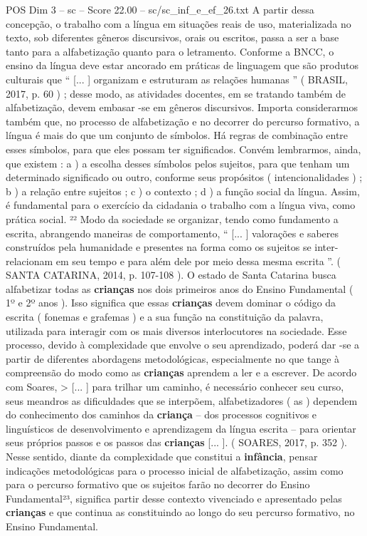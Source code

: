 \begin{textsample}{POS Dim 3 – sc – Score 22.00 – sc/sc\_inf\_e\_ef\_26.txt}
A partir dessa concepção, o trabalho com a língua em situações reais de uso, materializada no texto, sob diferentes gêneros discursivos, orais ou escritos, passa a ser a base tanto para a alfabetização quanto para o letramento.
Conforme a BNCC, o ensino da língua deve estar ancorado em práticas de linguagem que são produtos culturais que “ [... ] organizam e estruturam as relações humanas ” ( BRASIL, 2017, p. 60 ) ; desse modo, as atividades docentes, em se tratando também de alfabetização, devem embasar -se em gêneros discursivos.
Importa considerarmos também que, no processo de alfabetização e no decorrer do percurso formativo, a língua é mais do que um conjunto de símbolos.
Há regras de combinação entre esses símbolos, para que eles possam ter significados.
Convém lembrarmos, ainda, que existem : a ) a escolha desses símbolos pelos sujeitos, para que tenham um determinado significado ou outro, conforme seus propósitos ( intencionalidades ) ; b ) a relação entre sujeitos ; c ) o contexto ; d ) a função social da língua.
Assim, é fundamental para o exercício da cidadania o trabalho com a língua viva, como prática social. ²² Modo da sociedade se organizar, tendo como fundamento a escrita, abrangendo maneiras de comportamento, “ [... ] valorações e saberes construídos pela humanidade e presentes na forma como os sujeitos se inter-relacionam em seu tempo e para além dele por meio dessa mesma escrita ”. ( SANTA CATARINA, 2014, p. 107-108 ).
O estado de Santa Catarina busca alfabetizar todas as \textbf{crianças} nos dois primeiros anos do Ensino Fundamental ( 1º e 2º anos ).
Isso significa que essas \textbf{crianças} devem dominar o código da escrita ( fonemas e grafemas ) e a sua função na constituição da palavra, utilizada para interagir com os mais diversos interlocutores na sociedade.
Esse processo, devido à complexidade que envolve o seu aprendizado, poderá dar -se a partir de diferentes abordagens metodológicas, especialmente no que tange à compreensão do modo como as \textbf{crianças} aprendem a ler e a escrever.
De acordo com Soares, > [... ] para trilhar um caminho, é necessário conhecer seu curso, seus meandros as dificuldades que se interpõem, alfabetizadores ( as ) dependem do conhecimento dos caminhos da \textbf{criança} – dos processos cognitivos e linguísticos de desenvolvimento e aprendizagem da língua escrita – para orientar seus próprios passos e os passos das \textbf{crianças} [... ]. ( SOARES, 2017, p. 352 ).
Nesse sentido, diante da complexidade que constitui a \textbf{infância}, pensar indicações metodológicas para o processo inicial de alfabetização, assim como para o percurso formativo que os sujeitos farão no decorrer do Ensino Fundamental²³, significa partir desse contexto vivenciado e apresentado pelas \textbf{crianças} e que continua as constituindo ao longo do seu percurso formativo, no Ensino Fundamental.

\end{textsample}
